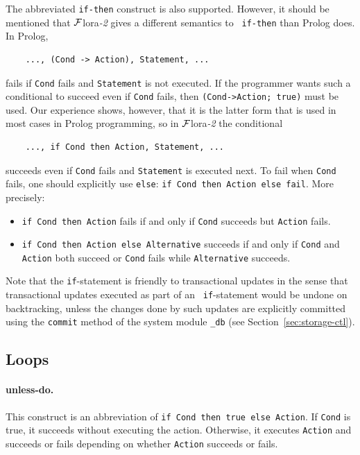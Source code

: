 \documentclass[11pt]{article}
\newcommand{\FLORA}{{\mbox{\sc ${\cal F}${lora}\rm\emph{-2}}}\xspace}
\begin{document}
The abbreviated {\tt if-then} construct is also supported.  However, it
should be mentioned that \FLORA gives a different semantics to {\tt
  if-then} than Prolog does. In Prolog,
\begin{verbatim}
    ..., (Cond -> Action), Statement, ...  
\end{verbatim}
fails if {\tt Cond} fails and {\tt Statement} is not executed. If the
programmer wants such a conditional to succeed even if {\tt Cond} fails, then
{\tt (Cond->Action; true)} must be used. Our experience shows, however,
that it is the latter form that is used in most cases in Prolog
programming, so in \FLORA the conditional
\begin{verbatim}
    ..., if Cond then Action, Statement, ...  
\end{verbatim}
succeeds even if {\tt Cond} fails and {\tt Statement} is executed next. To
fail when {\tt Cond} fails, one should explicitly use {\tt else}:
{\tt if Cond then Action else fail}. More precisely:
\begin{itemize}
  \item  {\tt if Cond then Action} fails if and only if {\tt Cond} succeeds
    but {\tt Action} fails.
  \item {\tt if Cond then Action else Alternative} succeeds if and only if 
    {\tt Cond} and {\tt Action} both succeed or {\tt Cond} fails while
    {\tt Alternative} succeeds.
\end{itemize}

Note that the {\tt if}-statement is friendly to transactional updates in
the sense that transactional updates executed as part of an {\tt
  if}-statement would be undone on backtracking, unless the changes done by
such updates are explicitly committed using the {\tt commit} method of the
system module {\tt \_db} (see Section~\ref{sec:storage-ctl}).

\subsection{Loops}
\paragraph{unless-do.}
This construct is an abbreviation of {\tt if Cond then true else Action}.
If {\tt Cond} is true, it succeeds without executing the action.
Otherwise, it executes {\tt Action} and succeeds or fails depending on
whether {\tt Action} succeeds or fails.
\end{document}
